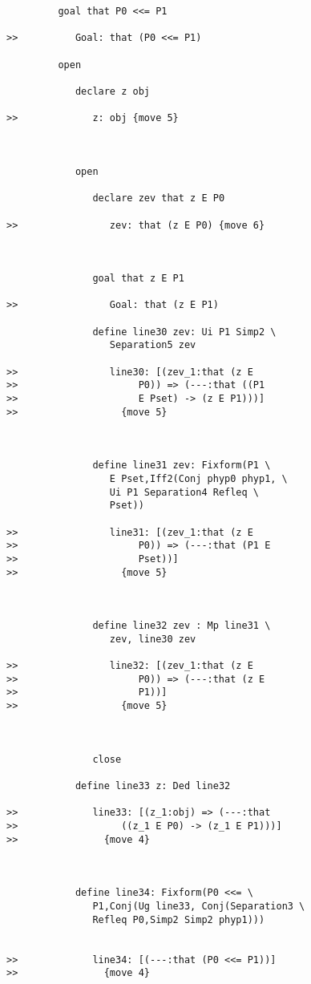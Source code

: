 \documentclass[12pt]{article}
\begin{document}
\begin{verbatim}
         goal that P0 <<= P1

>>          Goal: that (P0 <<= P1)

         open

            declare z obj

>>             z: obj {move 5}



            open

               declare zev that z E P0

>>                zev: that (z E P0) {move 6}



               goal that z E P1

>>                Goal: that (z E P1)

               define line30 zev: Ui P1 Simp2 \
                  Separation5 zev

>>                line30: [(zev_1:that (z E
>>                     P0)) => (---:that ((P1
>>                     E Pset) -> (z E P1)))]
>>                  {move 5}



               define line31 zev: Fixform(P1 \
                  E Pset,Iff2(Conj phyp0 phyp1, \
                  Ui P1 Separation4 Refleq \
                  Pset))

>>                line31: [(zev_1:that (z E
>>                     P0)) => (---:that (P1 E
>>                     Pset))]
>>                  {move 5}



               define line32 zev : Mp line31 \
                  zev, line30 zev

>>                line32: [(zev_1:that (z E
>>                     P0)) => (---:that (z E
>>                     P1))]
>>                  {move 5}



               close

            define line33 z: Ded line32

>>             line33: [(z_1:obj) => (---:that
>>                  ((z_1 E P0) -> (z_1 E P1)))]
>>               {move 4}



            define line34: Fixform(P0 <<= \
               P1,Conj(Ug line33, Conj(Separation3 \
               Refleq P0,Simp2 Simp2 phyp1)))


>>             line34: [(---:that (P0 <<= P1))]
>>               {move 4}




\end{verbatim}
\end{document}
